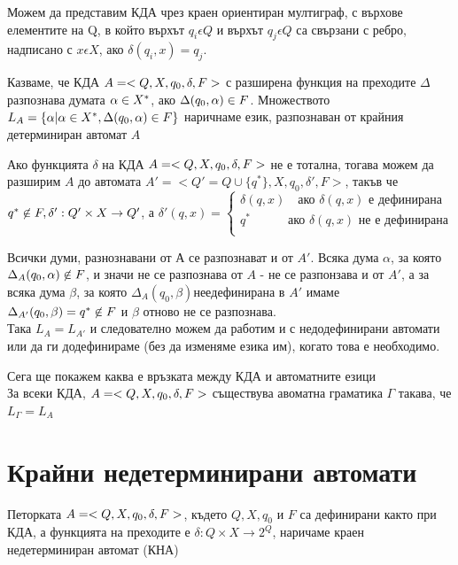 \documentclass[11pt]{article} %
\begin{document}
Можем да представим КДА чрез краен ориентиран мултиграф, с върхове елементите на Q, в който върхът $q_{i} \epsilon Q$ и върхът $q_{j} \epsilon Q$ са свързани с ребро, надписано с $x \epsilon X$, ако $\delta(q_{i}, x) = q_{j}$.

 Казваме, че КДА 
$A = <Q, X, q_{0}, \delta, F> $ с разширена функция на преходите 
$\Delta$ разпознава думата 
$\alpha \in X^{*}$, ако $\Delta(q_{0}, \alpha) \in F$. Множеството 
$L_{A} = \{\alpha| \alpha \in X^{*}, \Delta(q_{0}, \alpha) \in F\}$ наричнаме език, разпознаван от крайния детерминиран автомат $A$ \par

Ако функцията $\delta$ на КДА $A = <Q, X, q_{0}, \delta, F>$ не е тотална, тогава можем да разширим $A$ до автомата 
$A' = < Q' = Q \cup \{q^{*}\}, X, q_{0}, \delta', F>$, такъв че 
$q^{*} \centernot\in F, \delta' : Q' \times X \to Q'$, а
$\delta'(q, x) = 
	\begin{cases}
		\delta(q,x) \quad \text{ако } \delta(q,x) 
		\text{ е дефинирана}\\
		q^{*} \quad \quad \quad \text{ако } \delta(q,x)
		\text{ не е дефинирана} \\
	\end{cases}$\par
Всички думи, разнознавани от $А$ се разпознават и от $A'$. Всяка дума $\alpha$, за която 
$\Delta_{A}(q_{0},\alpha) \notBelongsTo F$, и значи не се разпознава от $A$ - не се разпонзава и от $A'$, а за всяка дума $\beta$, за която 
$\Delta_{A}(q_{0}, \beta) не е дефинирана$ в $A'$ имаме
$\Delta_{A'}(q_{0}, \beta) = q^{*} \notBelongsTo F$ и $\beta$ отново не се разпознава. \\
Така $L_{A} = L_{A'}$ и следователно можем да работим и с недодефинирани автомати или да ги додефинираме (без да изменяме езика им), когато това е необходимо. \par
Сега ще покажем каква е връзката между КДА и автоматните езици\\
 За всеки КДА, $A = <Q, X, q_{0}, \delta, F>$ съществува авоматна граматика $\Gamma$ такава, че $L_{\Gamma} = L_{A}$\\

\section{Крайни недетерминирани автомати}
 Петорката $A = <Q, X, q_{0}, \delta, F>$, където $Q, X, q_{0}$ и $F$ са дефинирани както при КДА, а функцията на преходите е $\delta : Q \times X \to 2^{Q}$, наричаме краен недетерминиран автомат (КНА) \par
\end{document}
